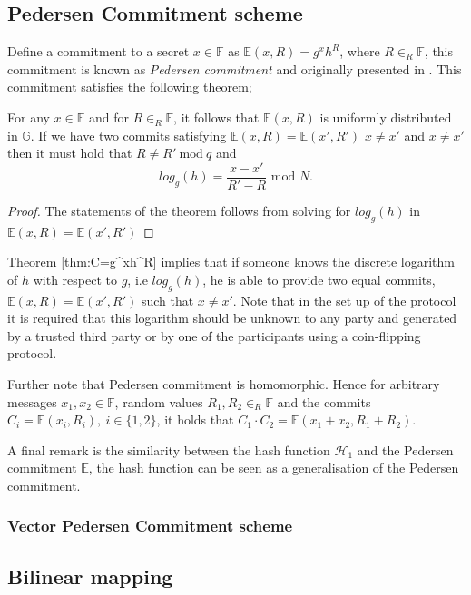 \subsection*{Pedersen Commitment scheme}
Define a commitment to a secret $x\in\mathds{F}$ as $\mathds{E}(x,R)=g^xh^R$, where $R\in_R\mathds{F}$, this commitment is known as \textit{Pedersen commitment} and originally presented in \cite{pedersen}. This commitment satisfies the following theorem;
\\
\begin{thm}
\label{thm:C=g^xh^R}
For any $x\in\mathds{F}$ and for $R\in_R\mathds{F}$, it follows that   $\mathds{E}(x,R)$ is uniformly distributed in $\mathds{G}$. If we have two commits satisfying $\mathds{E}(x,R)=\mathds{E}(x',R')$  $x\neq x'$ and  $x\neq x'$ then it must hold that $R\neq R' \:\text{mod}\:q$ and 
\begin{equation*}
    log_g(h) = \frac{x-x'}{R'-R} \text{ mod }N.
\end{equation*}
\end{thm}
\begin{proof}
The statements of the theorem follows from solving for $log_g(h)$ in $\mathds{E}(x,R)=\mathds{E}(x',R')$ 
\end{proof}

Theorem \ref{thm:C=g^xh^R} implies that if someone knows the discrete logarithm of $h$ with respect to $g$, i.e $log_g(h)$, he is able to provide two equal commits, $\mathds{E}(x,R)=\mathds{E}(x',R')$ such that $x\neq x'$. Note that in the set up of the protocol it is required that this logarithm should be unknown to any party and generated by a trusted third party or by one of the participants using a coin-flipping protocol.

Further note that Pedersen commitment is homomorphic. Hence for arbitrary messages $x_1,x_2\in\mathds{F}$, random values $R_1,R_2\in_R\mathds{F}$ and the commits $C_i=\mathds{E}(x_i,R_i),\:i\in\{1,2\}$, it holds that $C_1\cdot C_2 = \mathds{E}(x_1+x_2,R_1+R_2)$.

A final remark is the similarity between the hash function $\mathcal{H}_1$ and the Pedersen commitment $\mathds{E}$, the hash function can be seen as a generalisation of the Pedersen commitment. 

\subsubsection*{Vector Pedersen Commitment scheme}
\subsection*{Bilinear mapping}
\label{sec:bilinear}

